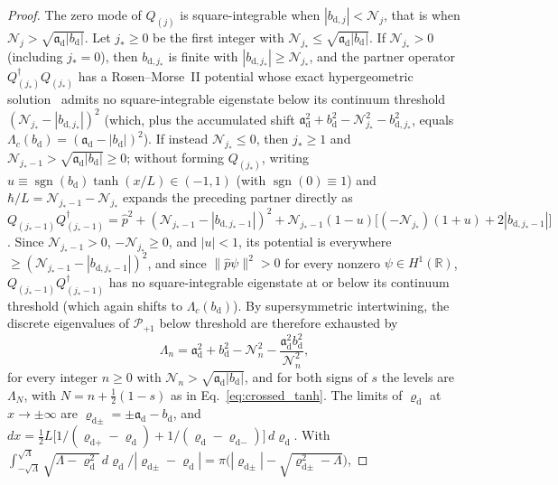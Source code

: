 \documentclass[aps,prd,onecolumn,tightenlines,nofootinbib,notitlepage,11pt,floatfix]{revtex4-2}
\theoremstyle{indentedtheorem}
\begin{document}
\begin{proof}
The zero mode of $Q_{(j)}$ is square-integrable when $|b_{\text{d},j}|<\mathcal{N}_j$, that is when $\mathcal{N}_j>\sqrt{\mathfrak{a}_\text{d}|b_\text{d}|}$. Let $j_*\ge 0$ be the first integer with $\mathcal{N}_{j_*}\le\sqrt{\mathfrak{a}_\text{d}|b_\text{d}|}$. If $\mathcal{N}_{j_*}>0$ (including $j_*=0$), then $b_{\text{d},j_*}$ is finite with $|b_{\text{d},j_*}|\ge\mathcal{N}_{j_*}$, and the partner operator $Q_{(j_*)}^\dagger Q_{(j_*)}$ has a Rosen--Morse~II potential whose exact hypergeometric solution~\citep{CooperKhareSukhatme1995Supersymmetry} admits no square-integrable eigenstate below its continuum threshold $(\mathcal{N}_{j_*}-|b_{\text{d},j_*}|)^2$ (which, plus the accumulated shift $\mathfrak{a}_\text{d}^2+b_\text{d}^2-\mathcal{N}_{j_*}^2-b_{\text{d},j_*}^2$, equals $\Lambda_c(b_\text{d})=(\mathfrak{a}_\text{d}-|b_\text{d}|)^2$). If instead $\mathcal{N}_{j_*}\le 0$, then $j_*\ge 1$ and $\mathcal{N}_{j_*-1}>\sqrt{\mathfrak{a}_\text{d}|b_\text{d}|}\ge 0$; without forming $Q_{(j_*)}$, writing $u\equiv\operatorname{sgn}(b_\text{d})\tanh(x/L)\in(-1,1)$ (with $\operatorname{sgn}(0)\equiv 1$) and $\hbar/L=\mathcal{N}_{j_*-1}-\mathcal{N}_{j_*}$ expands the preceding partner directly as $Q_{(j_*-1)}Q_{(j_*-1)}^\dagger = \hat{p}^2 + (\mathcal{N}_{j_*-1}-|b_{\text{d},j_*-1}|)^2 + \mathcal{N}_{j_*-1}(1-u)\big[(-\mathcal{N}_{j_*})(1+u)+2|b_{\text{d},j_*-1}|\big]$. Since $\mathcal{N}_{j_*-1}>0$, $-\mathcal{N}_{j_*}\ge 0$, and $|u|<1$, its potential is everywhere $\ge (\mathcal{N}_{j_*-1}-|b_{\text{d},j_*-1}|)^2$, and since $\|\hat{p}\psi\|^2>0$ for every nonzero $\psi\in H^1(\mathbb{R})$, $Q_{(j_*-1)}Q_{(j_*-1)}^\dagger$ has no square-integrable eigenstate at or below its continuum threshold (which again shifts to $\Lambda_c(b_\text{d})$). By supersymmetric intertwining, the discrete eigenvalues of $\mathcal{P}_{+1}$ below threshold are therefore exhausted by
\begin{equation*}
    \Lambda_n = \mathfrak{a}_\text{d}^2+b_\text{d}^2-\mathcal{N}_n^2-\frac{\mathfrak{a}_\text{d}^2b_\text{d}^2}{\mathcal{N}_n^2} ,
\end{equation*}
for every integer $n\geq0$ with $\mathcal{N}_n>\sqrt{\mathfrak{a}_\text{d}|b_\text{d}|}$, and for both signs of $s$ the levels are $\Lambda_N$, with $N=n+\tfrac{1}{2}(1-s)$ as in Eq.~\eqref{eq:crossed_tanh}. The limits of $\varrho_\text{d}$ at $x\to\pm\infty$ are $\varrho_{\text{d}\pm}=\pm\mathfrak{a}_\text{d}-b_\text{d}$, and $dx=\tfrac{1}{2}L\big[1/(\varrho_{\text{d}+}-\varrho_\text{d})+1/(\varrho_\text{d}-\varrho_{\text{d}-})\big]\,d\varrho_\text{d}$. With $\int_{-\sqrt{\Lambda}}^{\sqrt{\Lambda}}\sqrt{\Lambda-\varrho_\text{d}^2}\,d\varrho_\text{d}/|\varrho_{\text{d}\pm}-\varrho_\text{d}|=\pi\big(|\varrho_{\text{d}\pm}|-\sqrt{\varrho_{\text{d}\pm}^2-\Lambda}\big)$,

\end{proof}
\end{document}
